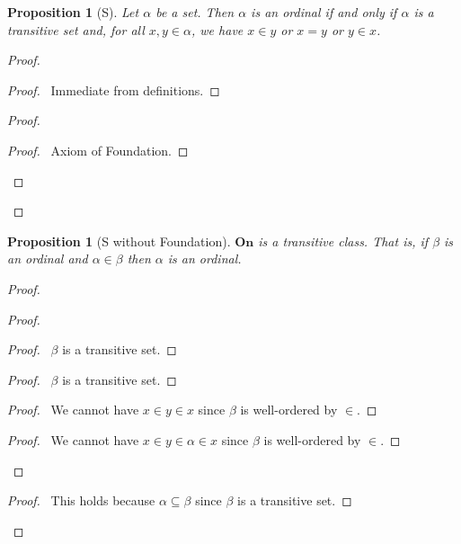 \documentclass{book}
\let\qed\relax
\newtheorem{prop}[ax]{Proposition}
\theoremstyle{definition}
\begin{document}
\begin{prop}[S]
Let $\alpha$ be a set. Then $\alpha$ is an ordinal if and only if $\alpha$ is a transitive set and, for all $x,y \in \alpha$, we have $x \in y$ or $x = y$ or $y \in x$.
\end{prop}

\begin{proof}
\pf
{}
\begin{proof}
	\pf\ Immediate from definitions.
\end{proof}
\begin{proof}
	\begin{proof}
		\pf\ Axiom of Foundation.
	\end{proof}
\end{proof}
\qed
\end{proof}

\begin{prop}[S without Foundation]
\label{prop:Ontransitive}
$\mathbf{On}$ is a transitive class. That is,
if $\beta$ is an ordinal and $\alpha \in \beta$ then $\alpha$ is an ordinal.
\end{prop}

\begin{proof}
\pf
{}
\begin{proof}
	\begin{proof}
		\pf\ $\beta$ is a transitive set.
	\end{proof}
	\begin{proof}
		\pf\ $\beta$ is a transitive set.
	\end{proof}
	\begin{proof}
		\pf\ We cannot have $x \in y \in x$ since $\beta$ is well-ordered by $\in$.
	\end{proof}
	\begin{proof}
		\pf\ We cannot have $x \in y \in \alpha \in x$ since $\beta$ is well-ordered by $\in$.
	\end{proof}
\end{proof}
\begin{proof}
	\pf\ This holds because $\alpha \subseteq \beta$ since $\beta$ is a transitive set.
\end{proof}
\qed
\end{proof}
\end{document}
